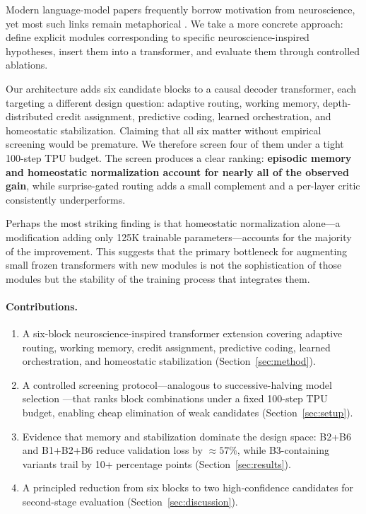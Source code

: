 \documentclass[11pt]{article}
\begin{document}
Modern language-model papers frequently borrow motivation from neuroscience, yet
most such links remain metaphorical \citep{hassabis2017neuroscience}.
We take a more concrete approach: define explicit modules corresponding to
specific neuroscience-inspired hypotheses, insert them into a transformer, and
evaluate them through controlled ablations.

Our architecture adds six candidate blocks to a causal decoder transformer,
each targeting a different design question: adaptive routing, working memory,
depth-distributed credit assignment, predictive coding, learned orchestration,
and homeostatic stabilization.
Claiming that all six matter without empirical screening would be premature.
We therefore screen four of them under a tight 100-step TPU budget.
The screen produces a clear ranking: \textbf{episodic memory and homeostatic
normalization account for nearly all of the observed gain}, while
surprise-gated routing adds a small complement and a per-layer critic
consistently underperforms.

Perhaps the most striking finding is that homeostatic normalization
alone---a modification adding only 125K trainable parameters---accounts for
the majority of the improvement.
This suggests that the primary bottleneck for augmenting small frozen
transformers with new modules is not the sophistication of those modules but
the stability of the training process that integrates them.

\paragraph{Contributions.}
\begin{enumerate}[leftmargin=1.5em]
  \item A six-block neuroscience-inspired transformer extension covering
        adaptive routing, working memory, credit assignment, predictive coding,
        learned orchestration, and homeostatic stabilization
        (Section~\ref{sec:method}).
  \item A controlled screening protocol---analogous to successive-halving model
        selection \citep{li2018hyperband}---that ranks block combinations under
        a fixed 100-step TPU budget, enabling cheap elimination of weak
        candidates (Section~\ref{sec:setup}).
  \item Evidence that memory and stabilization dominate the design space:
        B2+B6 and B1+B2+B6 reduce validation loss by ${\approx}57\%$, while
        B3-containing variants trail by 10+ percentage points
        (Section~\ref{sec:results}).
  \item A principled reduction from six blocks to two high-confidence
        candidates for second-stage evaluation
        (Section~\ref{sec:discussion}).
\end{enumerate}
\end{document}

